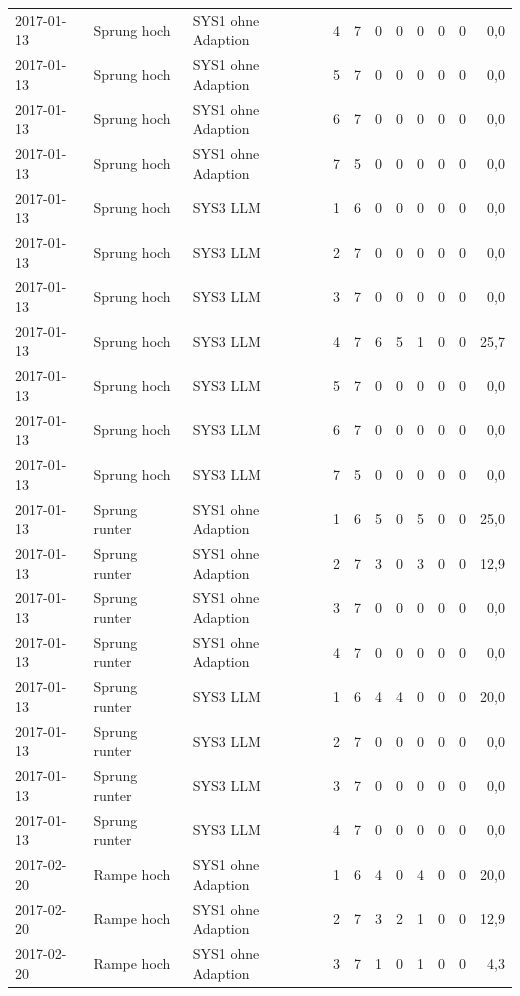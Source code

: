 \begin{tabular}{lllrrrrrrrr}
2017-01-13 & Sprung hoch & SYS1 ohne Adaption & 4 & 7 & 0 & 0 & 0 & 0 & 0 & 0,0 \\
2017-01-13 & Sprung hoch & SYS1 ohne Adaption & 5 & 7 & 0 & 0 & 0 & 0 & 0 & 0,0 \\
2017-01-13 & Sprung hoch & SYS1 ohne Adaption & 6 & 7 & 0 & 0 & 0 & 0 & 0 & 0,0 \\
2017-01-13 & Sprung hoch & SYS1 ohne Adaption & 7 & 5 & 0 & 0 & 0 & 0 & 0 & 0,0 \\
2017-01-13 & Sprung hoch & SYS3 LLM & 1 & 6 & 0 & 0 & 0 & 0 & 0 & 0,0 \\
2017-01-13 & Sprung hoch & SYS3 LLM & 2 & 7 & 0 & 0 & 0 & 0 & 0 & 0,0 \\
2017-01-13 & Sprung hoch & SYS3 LLM & 3 & 7 & 0 & 0 & 0 & 0 & 0 & 0,0 \\
2017-01-13 & Sprung hoch & SYS3 LLM & 4 & 7 & 6 & 5 & 1 & 0 & 0 & 25,7 \\
2017-01-13 & Sprung hoch & SYS3 LLM & 5 & 7 & 0 & 0 & 0 & 0 & 0 & 0,0 \\
2017-01-13 & Sprung hoch & SYS3 LLM & 6 & 7 & 0 & 0 & 0 & 0 & 0 & 0,0 \\
2017-01-13 & Sprung hoch & SYS3 LLM & 7 & 5 & 0 & 0 & 0 & 0 & 0 & 0,0 \\
2017-01-13 & Sprung runter & SYS1 ohne Adaption & 1 & 6 & 5 & 0 & 5 & 0 & 0 & 25,0 \\
2017-01-13 & Sprung runter & SYS1 ohne Adaption & 2 & 7 & 3 & 0 & 3 & 0 & 0 & 12,9 \\
2017-01-13 & Sprung runter & SYS1 ohne Adaption & 3 & 7 & 0 & 0 & 0 & 0 & 0 & 0,0 \\
2017-01-13 & Sprung runter & SYS1 ohne Adaption & 4 & 7 & 0 & 0 & 0 & 0 & 0 & 0,0 \\
2017-01-13 & Sprung runter & SYS3 LLM & 1 & 6 & 4 & 4 & 0 & 0 & 0 & 20,0 \\
2017-01-13 & Sprung runter & SYS3 LLM & 2 & 7 & 0 & 0 & 0 & 0 & 0 & 0,0 \\
2017-01-13 & Sprung runter & SYS3 LLM & 3 & 7 & 0 & 0 & 0 & 0 & 0 & 0,0 \\
2017-01-13 & Sprung runter & SYS3 LLM & 4 & 7 & 0 & 0 & 0 & 0 & 0 & 0,0 \\
2017-02-20 & Rampe hoch & SYS1 ohne Adaption & 1 & 6 & 4 & 0 & 4 & 0 & 0 & 20,0 \\
2017-02-20 & Rampe hoch & SYS1 ohne Adaption & 2 & 7 & 3 & 2 & 1 & 0 & 0 & 12,9 \\
2017-02-20 & Rampe hoch & SYS1 ohne Adaption & 3 & 7 & 1 & 0 & 1 & 0 & 0 & 4,3 \\

\end{tabular}
